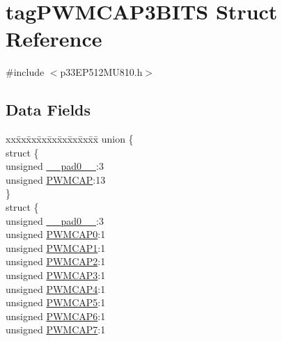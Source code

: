 \hypertarget{structtag_p_w_m_c_a_p3_b_i_t_s}{}\section{tag\+P\+W\+M\+C\+A\+P3\+B\+I\+TS Struct Reference}
\label{structtag_p_w_m_c_a_p3_b_i_t_s}


{\ttfamily \#include $<$p33\+E\+P512\+M\+U810.\+h$>$}

\subsection*{Data Fields}
\begin{DoxyCompactItemize}
\item 
\begin{tabbing}
xx\=xx\=xx\=xx\=xx\=xx\=xx\=xx\=xx\=\kill
union \{\\
\>struct \{\\
\>\>unsigned \hyperlink{structtag_p_w_m_c_a_p3_b_i_t_s_adf71f3d8410c1f1dbbc96680a92c49af}{\_\_pad0\_\_}:3\\
\>\>unsigned \hyperlink{structtag_p_w_m_c_a_p3_b_i_t_s_a3877a5299772d03214ef452994c53979}{PWMCAP}:13\\
\>\} \\
\>struct \{\\
\>\>unsigned \hyperlink{structtag_p_w_m_c_a_p3_b_i_t_s_adf71f3d8410c1f1dbbc96680a92c49af}{\_\_pad0\_\_}:3\\
\>\>unsigned \hyperlink{structtag_p_w_m_c_a_p3_b_i_t_s_a34c685289d01ac79a9b067b945e411b0}{PWMCAP0}:1\\
\>\>unsigned \hyperlink{structtag_p_w_m_c_a_p3_b_i_t_s_a4c90f0d96eece06b7d6c7e41e394b417}{PWMCAP1}:1\\
\>\>unsigned \hyperlink{structtag_p_w_m_c_a_p3_b_i_t_s_a2111a4368f6512c24cf193f6c83672e3}{PWMCAP2}:1\\
\>\>unsigned \hyperlink{structtag_p_w_m_c_a_p3_b_i_t_s_a5d3e7376fc29096ef98492e81f73590d}{PWMCAP3}:1\\
\>\>unsigned \hyperlink{structtag_p_w_m_c_a_p3_b_i_t_s_a07f7fb680f8c9bdd5d3c94a84a30a7b5}{PWMCAP4}:1\\
\>\>unsigned \hyperlink{structtag_p_w_m_c_a_p3_b_i_t_s_a434b71ab2093a53faf535c8f27973f7b}{PWMCAP5}:1\\
\>\>unsigned \hyperlink{structtag_p_w_m_c_a_p3_b_i_t_s_a4249adbed71df183d967bd51f8d811fa}{PWMCAP6}:1\\
\>\>unsigned \hyperlink{structtag_p_w_m_c_a_p3_b_i_t_s_a282c7ae90ac64b1a78eb1351a7d0eee0}{PWMCAP7}:1\\

\end{tabbing}
\end{DoxyCompactItemize}
